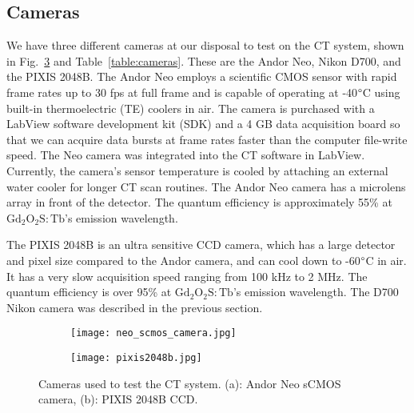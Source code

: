 \subsection{Cameras}
We have three different cameras at our disposal to test on the CT system, shown in Fig.~\ref{fig:cameras} and Table~\ref{table:cameras}.  These are the Andor Neo, Nikon D700, and the PIXIS 2048B.  The Andor Neo employs a scientific CMOS sensor with rapid frame rates up to 30 fps at full frame and is capable of operating at -40$\degree$C using built-in thermoelectric (TE) coolers in air.  The camera is purchased with a LabView software development kit (SDK) and a 4 GB data acquisition board so that we can acquire data bursts at frame rates faster than the computer file-write speed.  The Neo camera was integrated into the CT software in LabView.  Currently, the camera's sensor temperature is cooled by attaching an external water cooler for longer CT scan routines.  The Andor Neo camera has a microlens array in front of the detector.  The quantum efficiency is approximately 55\% at $\mathrm{Gd_2O_2S:Tb}$'s emission wavelength.

The PIXIS 2048B is an ultra sensitive CCD camera, which has a large detector and pixel size compared to the Andor camera, and can cool down to -60$\degree$C in air.  It has a very slow acquisition speed ranging from 100 kHz to 2 MHz.  The quantum efficiency is over 95\% at $\mathrm{Gd_2O_2S:Tb}$'s emission wavelength. The D700 Nikon camera was described in the previous section.
%
\begin{figure}
	\begin{subfigure}[b]{0.45\linewidth}
	\centering
	\texttt{[image: neo\_scmos\_camera.jpg]}
	\caption{}
	\label{fig:neo}
	\end{subfigure}
\hspace{1 cm}	
	\begin{subfigure}[b]{0.45\linewidth}
	\centering
	\texttt{[image: pixis2048b.jpg]}
	\caption{}
	\label{fig:pixis}
	\end{subfigure}
\caption{Cameras used to test the CT system. (a): Andor Neo sCMOS camera, (b): PIXIS 2048B CCD.}
\label{fig:cameras}
\end{figure}


